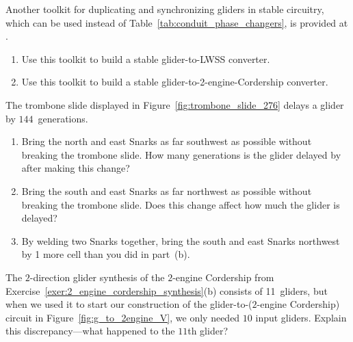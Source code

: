 \begin{multicols}{2}
	\mfilbreak
	
	
	\begin{problem}\label{exer:other_toolkit_stable_conduits}
		Another toolkit for duplicating and synchronizing gliders in stable circuitry, which can be used instead of Table~\ref{tab:conduit_phase_changers}, is provided at . \smallskip
		
		\begin{enumerate}[label=\bf\color{ocre}(\alph*)]
			\item {} Use this toolkit to build a stable glider-to-LWSS converter.
			
			\item {} Use this toolkit to build a stable glider-to-2-engine-Cordership converter.
		\end{enumerate}
	\end{problem}


	\mfilbreak
	
	
	\begin{problem}\label{exer:faster_trombone_slide}
		The trombone slide displayed in Figure~\ref{fig:trombone_slide_276} delays a glider by $144$~generations.\smallskip
		
		\begin{enumerate}[label=\bf\color{ocre}(\alph*)]
			\item {} Bring the north and east Snarks as far southwest as possible without breaking the trombone slide. How many generations is the glider delayed by after making this change?
			\item {} Bring the south and east Snarks as far northwest as possible without breaking the trombone slide. Does this change affect how much the glider is delayed?
			
			\item {} By welding two Snarks together, bring the south and east Snarks northwest by 1 more cell than you did in part~(b).
		\end{enumerate}
	\end{problem}
	
	
	\mfilbreak
	
	
	\begin{problemstar}\label{fig:g_to_2engine_why_10_gliders} 
		The $2$-direction glider synthesis of the $2$-engine Cordership from Exercise~\ref{exer:2_engine_cordership_synthesis}(b) consists of 11~gliders, but when we used it to start our construction of the glider-to-($2$-engine Cordership) circuit in Figure~\ref{fig:g_to_2engine_V}, we only needed $10$ input gliders. Explain this discrepancy---what happened to the $11$th glider?
	\end{problemstar}
	

\end{multicols}
